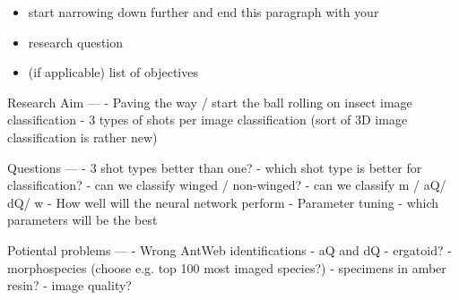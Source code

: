 \begin{itemize}
\item start narrowing down further and end this paragraph with your 
\item research question 
\item (if applicable) list of objectives 
\end{itemize}


Research Aim
--- 
- Paving the way / start the ball rolling on insect image classification
- 3 types of shots per image classification (sort of 3D image classification is rather new)

Questions 
---
- 3 shot types better than one?
- which shot type is better for classification?
- can we classify winged / non-winged?
- can we classify m / aQ/ dQ/ w
- How well will the neural network perform
- Parameter tuning - which parameters will be the best


Potiental problems
---
- Wrong AntWeb identifications
- aQ and dQ
- ergatoid?
- morphospecies (choose e.g. top 100 most imaged species?)
- specimens in amber resin?
- image quality?